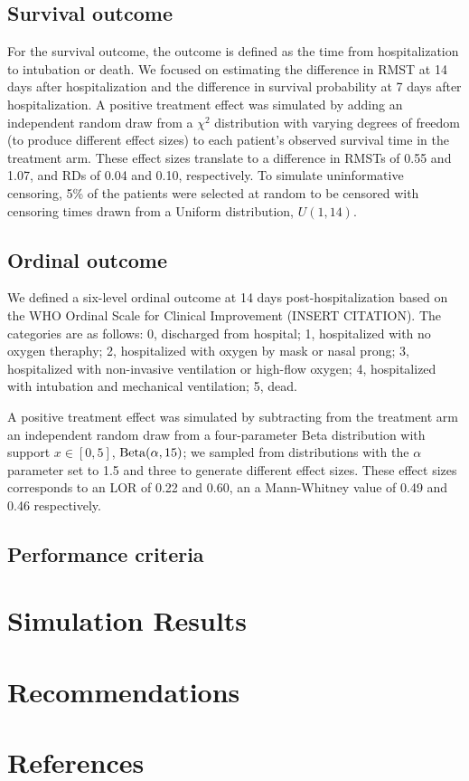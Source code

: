 \documentclass{article}
\begin{document}
\subsection{Survival outcome}

For the survival outcome, the outcome is defined as the time from hospitalization to intubation or death. We focused on estimating the difference in RMST at 14 days after hospitalization and the difference in survival probability at 7 days after hospitalization. A positive treatment effect was simulated by adding an independent random draw from a $\chi^2$ distribution with varying degrees of freedom (to produce different effect sizes) to each patient's observed survival time in the treatment arm. These effect sizes translate to a difference in RMSTs of 0.55 and 1.07, and RDs of 0.04 and 0.10, respectively. To simulate uninformative censoring, 5\% of the patients were selected at random to be censored with censoring times drawn from a Uniform distribution, $U(1, 14)$. 

\subsection{Ordinal outcome}

We defined a six-level ordinal outcome at 14 days post-hospitalization based on the WHO Ordinal Scale for Clinical Improvement (INSERT CITATION). The categories are as follows: 0, discharged from hospital; 1, hospitalized with no oxygen theraphy; 2, hospitalized with oxygen by mask or nasal prong; 3, hospitalized with non-invasive ventilation or high-flow oxygen; 4, hospitalized with intubation and mechanical ventilation; 5, dead.

A positive treatment effect was simulated by subtracting from the treatment arm an independent random draw from a four-parameter Beta distribution with support $x \in [0, 5]$, $\textnormal{Beta}(\alpha, 15)$; we sampled from distributions with the $\alpha$ parameter set to 1.5 and three to generate different effect sizes. These effect sizes corresponds to an LOR of 0.22 and 0.60, an a Mann-Whitney value of 0.49 and 0.46 respectively. 

\subsection{Performance criteria}

\section{Simulation Results}

\section{Recommendations}

\section{References}



\appendix
\end{document}
